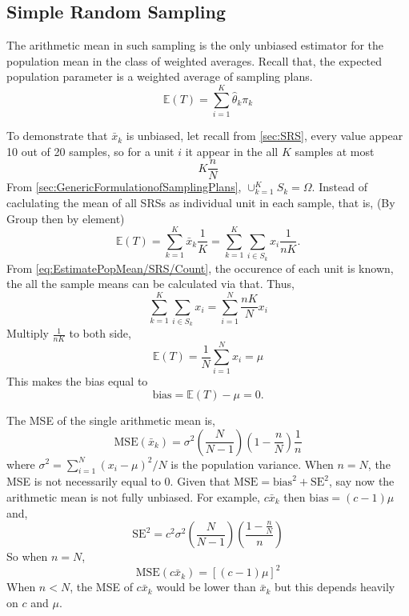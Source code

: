 \subsection{Simple Random Sampling}
The arithmetic mean in such sampling is the only unbiased estimator for the population mean in the class of weighted averages. Recall that, the expected population parameter is a weighted average of sampling plans.
\begin{equation*}
    \mathbb{E}(T)=\sum^K_{i=1}\hat{\theta}_k\pi_k
\end{equation*}
\begin{proofbox}
    To demonstrate that $\bar{x}_k$ is unbiased, let recall from \cref{sec:SRS}, every value appear 10 out of 20 samples, so for a unit $i$ it appear in the all $K$ samples at most
    \begin{equation}\label{eq:EstimatePopMean/SRS/Count}
        K\frac{n}{N}
    \end{equation}
    From \cref{sec:GenericFormulationofSamplingPlans}, $\cup_{k=1}^K S_k=\Omega$. Instead of caclulating the mean of all SRSs as individual unit in each sample, that is, (By Group then by element)
    \begin{equation}
        \mathbb{E}(T)
            = \sum_{k=1}^{K} \bar{x}_k\frac1K
            = \sum_{k=1}^{K} \sum_{i \in S_k}x_i \frac{1}{nK}.
    \end{equation}
    From \cref{eq:EstimatePopMean/SRS/Count}, the occurence of each unit is known, the all the sample means can be calculated via that. Thus,
    \begin{equation}
        \sum_{k=1}^{K} \sum_{i \in S_k}x_i= \sum^N_{i=1}\frac{nK}{N}x_i
    \end{equation}
    Multiply $\frac{1}{nK}$ to both side,
    \begin{equation*}
        \mathbb{E}(T)=\frac1N\sum^N_{i=1}x_i=\mu
    \end{equation*}
    This makes the bias equal to
    \begin{equation}
        \text{bias} = \mathbb{E}(T) - \mu = 0.
    \end{equation} 
\end{proofbox}

The MSE of the single arithmetic mean is,
\begin{equation}
    \mathrm{MSE}(\bar{x}_k)=\sigma^2\left(\frac{N}{N-1}\right)\left(1-\frac{n}{N}\right)\frac1n
\end{equation}
where $\sigma^2=\sum_{i=1}^{N}(x_i-\mu)^2/N$ is the population variance. When $n=N$, the MSE is not necessarily equal to 0. Given that $\mathrm{MSE}=\mathrm{bias}^2+\mathrm{SE}^2$, say now the arithmetic mean is not fully 
unbiased. For example, $c\bar{x}_k$ then $\mathrm{bias}=(c-1)\mu$ and,
\begin{equation}
    \mathrm{SE}^2=c^2\sigma^2\left(\frac{N}{N-1}\right)\left(\frac{1-\frac{n}{N}}{n}\right)
\end{equation}
So when $n=N$, 
\begin{equation}
    \mathrm{MSE}(c\bar{x}_k)=[(c-1)\mu]^2
\end{equation}
When $n<N$, the MSE of $c\bar{x}_k$ would be lower than $\bar{x}_k$ but this depends heavily on $c$ and $\mu$.


